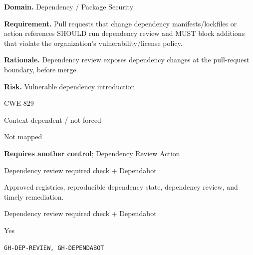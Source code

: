 \documentclass[10pt,letterpaper]{article}
\newcommand{\prioritybadge}[2]{\tcbox[on line,boxrule=0pt,arc=1.2mm,boxsep=0.7mm,left=1mm,right=1mm,top=0.4mm,bottom=0.4mm,colback=#2!12,coltext=#2]{\scriptsize\bfseries #1}}
\begin{document}
\begin{rulebox}[title={\texttt{SCS-ACTIONS-DEP-002} \hfill \prioritybadge{High Priority}{High}}]
\textbf{Domain.} Dependency / Package Security

\textbf{Requirement.} Pull requests that change dependency manifests/lockfiles or action references SHOULD run dependency review and MUST block additions that violate the organization's vulnerability/license policy.

\textbf{Rationale.} Dependency review exposes dependency changes at the pull-request boundary, before merge.

\textbf{Risk.} Vulnerable dependency introduction

\begin{description}[leftmargin=2.65cm,labelwidth=2.3cm,style=nextline,itemsep=1pt,topsep=3pt]
  \item[CWE] CWE-829
  \item[OWASP] Context-dependent / not forced
  \item[CERT] Not mapped
  \item[CodeQL] \textbf{Requires another control}; Dependency Review Action
  \item[Enforcement] Dependency review required check + Dependabot
  \item[Prevention] Approved registries, reproducible dependency state, dependency review, and timely remediation.
  \item[Verification] Dependency review required check + Dependabot
  \item[Automation] Yes
  \item[Sources] \texttt{GH-DEP-REVIEW, GH-DEPENDABOT}
\end{description}
\end{rulebox}
\end{document}
